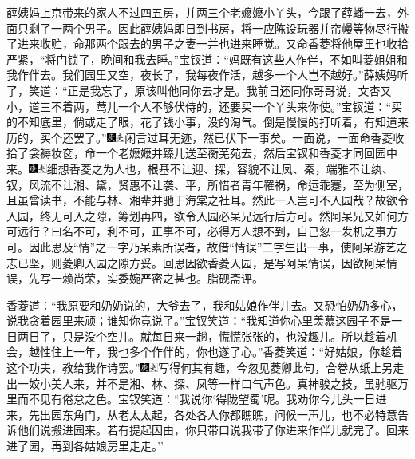 薛姨妈上京带来的家人不过四五房，并两三个老嬷嬷小丫头，今跟了薛蟠一去，外面只剩了一两个男子。因此薛姨妈即日到书房，将一应陈设玩器并帘幔等物尽行搬了进来收贮，命那两个跟去的男子之妻一并也进来睡觉。又命香菱将他屋里也收拾严紧，``将门锁了，晚间和我去睡。''宝钗道：``妈既有这些人作伴，不如叫菱姐姐和我作伴去。我们园里又空，夜长了，我每夜作活，越多一个人岂不越好。''薛姨妈听了，笑道：``正是我忘了，原该叫他同你去才是。我前日还同你哥哥说，文杏又小，道三不着两，莺儿一个人不够伏侍的，还要买一个丫头来你使。''宝钗道：``买的不知底里，倘或走了眼，花了钱小事，没的淘气。倒是慢慢的打听着，有知道来历的，买个还罢了。''{\includegraphics[width=3mm]{../Images/00004}\includegraphics[width=3mm]{../Images/00012}\footnotesize \kaishu 闲言过耳无迹，然已伏下一事矣。}一面说，一面命香菱收拾了衾褥妆奁，命一个老嬷嬷并臻儿送至蘅芜苑去，然后宝钗和香菱才同回园中来。{\includegraphics[width=3mm]{../Images/00004}\includegraphics[width=3mm]{../Images/00012}\footnotesize \kaishu 细想香菱之为人也，根基不让迎、探，容貌不让凤、秦，端雅不让纨、钗，风流不让湘、黛，贤惠不让袭、平，所惜者青年罹祸，命运乖蹇，至为侧室，且虽曾读书，不能与林、湘辈并驰于海棠之社耳。然此一人岂可不入园哉？故欲令入园，终无可入之隙，筹划再四，欲令入园必呆兄远行后方可。然阿呆兄又如何方可远行？曰名不可，利不可，正事不可，必得万人想不到，自己忽一发机之事方可。因此思及``情''之一字乃呆素所误者，故借``情误''二字生出一事，使阿呆游艺之志已坚，则菱卿入园之隙方妥。回思因欲香菱入园，是写阿呆情误，因欲阿呆情误，先写一赖尚荣，实委婉严密之甚也。脂砚斋评。}

香菱道：``我原要和奶奶说的，大爷去了，我和姑娘作伴儿去。又恐怕奶奶多心，说我贪着园里来顽；谁知你竟说了。''宝钗笑道：``我知道你心里羡慕这园子不是一日两日了，只是没个空儿。就每日来一趟，慌慌张张的，也没趣儿。所以趁着机会，越性住上一年，我也多个作伴的，你也遂了心。''香菱笑道：``好姑娘，你趁着这个功夫，教给我作诗罢。''{\includegraphics[width=3mm]{../Images/00004}\includegraphics[width=3mm]{../Images/00012}\footnotesize \kaishu 写得何其有趣，今忽见菱卿此句，合卷从纸上另走出一姣小美人来，并不是湘、林、探、凤等一样口气声色。真神骏之技，虽驰驱万里而不见有倦怠之色。}宝钗笑道：``我说你`得陇望蜀'呢。我劝你今儿头一日进来，先出园东角门，从老太太起，各处各人你都瞧瞧，问候一声儿，也不必特意告诉他们说搬进园来。若有提起因由，你只带口说我带了你进来作伴儿就完了。回来进了园，再到各姑娘房里走走。''

